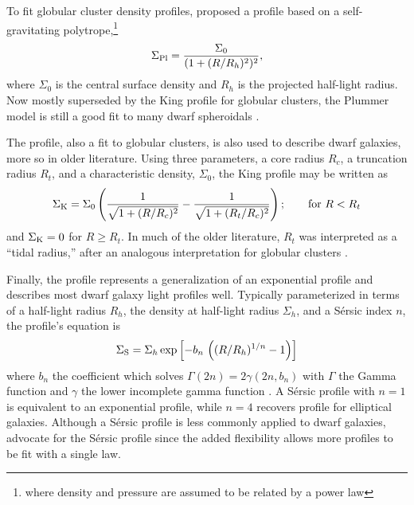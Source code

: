 To fit globular cluster density profiles, \citet{plummer1911} proposed a
profile based on a self-gravitating polytrope,\footnote{where density
  and pressure are assumed to be related by a power law}
\begin{equation}{
\Sigma_{\rm Pl} = \frac{\Sigma_0}{(1 + (R/R_h)^2)^2},
}\end{equation} where \(\Sigma_0\) is the central surface density and
\(R_h\) is the projected half-light radius. Now mostly superseded by the
King profile for globular clusters, the Plummer model is still a good
fit to many dwarf spheroidals \citep[e.g.,][]{moskowitz+walker2020}.

The \citet{king1962} profile, also a fit to globular clusters, is also
used to describe dwarf galaxies, more so in older literature. Using
three parameters, a core radius \(R_c\), a truncation radius \(R_t\),
and a characteristic density, \(\Sigma_0\), the King profile may be
written as \begin{equation}{
\Sigma_{\rm K} = \Sigma_0\left(\frac{1}{\sqrt{1 + (R/R_c)^2}} - \frac{1}{\sqrt{1+(R_t/R_c)^2}}\right); \qquad \text{for } R<R_t
}\end{equation} and \(\Sigma_{\rm K}=0\) for \(R \geq R_t\). In much of
the older literature, \(R_t\) was interpreted as a ``tidal radius,''
after an analogous interpretation for globular clusters
\citep[e.g.,][]{hodge1961, IH1995}.

Finally, the \citet{sersic1963} profile represents a generalization of
an exponential profile and describes most dwarf galaxy light profiles
well. Typically parameterized in terms of a half-light radius \(R_h\),
the density at half-light radius \(\Sigma_h\), and a Sérsic index \(n\),
the profile's equation is \begin{equation}{
\Sigma_{\rm S} = \Sigma_h \exp\left[-b_n \,  \left((R/R_h)^{1/n} - 1\right)\right]
}\end{equation} where \(b_n\) the coefficient which solves
\(\Gamma(2n) = 2\gamma(2n, b_n)\) with \(\Gamma\) the Gamma function and
\(\gamma\) the lower incomplete gamma function
\citep{graham+driver2005}. A Sérsic profile with \(n=1\) is equivalent
to an exponential profile, while \(n=4\) recovers
 profile for elliptical galaxies. Although a
Sérsic profile is less commonly applied to dwarf galaxies,
\citet{munoz+2018} advocate for the Sérsic profile since the added
flexibility allows more profiles to be fit with a single law.

